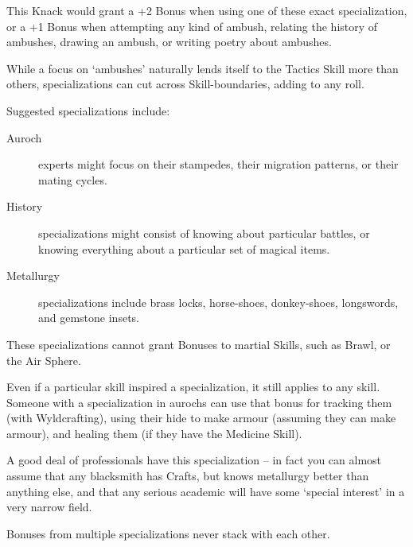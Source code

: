 \begin{multicols}{2}
This Knack would grant a +2 Bonus when using one of these exact specialization, or a +1 Bonus when attempting any kind of ambush, relating the history of ambushes, drawing an ambush, or writing poetry about ambushes.

While a focus on `ambushes' naturally lends itself to the Tactics Skill more than others, specializations can cut across Skill-boundaries, adding to any roll.

Suggested specializations include:

\begin{description}
  \item[Auroch]
  experts might focus on their stampedes, their migration patterns, or their mating cycles.
  \item[History]
  specializations might consist of knowing about particular battles, or knowing everything about a particular set of magical items.
  \item[Metallurgy]
  specializations include brass locks, horse-shoes, donkey-shoes, longswords, and gemstone insets.
\end{description}

These specializations cannot grant Bonuses to martial Skills, such as Brawl, or the Air Sphere.

Even if a particular skill inspired a specialization, it still applies to any skill.
Someone with a specialization in aurochs can use that bonus for tracking them (with Wyldcrafting), using their hide to make armour (assuming they can make armour), and healing them (if they have the Medicine Skill).

A good deal of professionals have this specialization -- in fact you can almost assume that any blacksmith has Crafts, but knows metallurgy better than anything else, and that any serious academic will have some `special interest' in a very narrow field.

Bonuses from multiple specializations never stack with each other.

\end{multicols}

